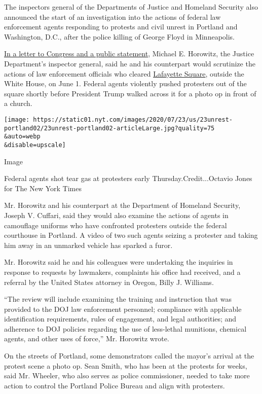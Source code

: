 The inspectors general of the Departments of Justice and Homeland
Security also announced the start of an investigation into the actions
of federal law enforcement agents responding to protests and civil
unrest in Portland and Washington, D.C., after the police killing of
George Floyd in Minneapolis.

\href{https://twitter.com/DanielStrauss4/status/1286375148115963904}{In
a letter to Congress and a public statement}, Michael E. Horowitz, the
Justice Department's inspector general, said he and his counterpart
would scrutinize the actions of law enforcement officials who cleared
\href{https://www.nytimes.com/2020/07/28/us/politics/lafayette-square-park-police-protests.html}{Lafayette
Square}, outside the White House, on June 1. Federal agents violently
pushed protesters out of the square shortly before President Trump
walked across it for a photo op in front of a church.

\texttt{[image: https://static01.nyt.com/images/2020/07/23/us/23unrest-portland02/23unrest-portland02-articleLarge.jpg?quality=75\\\&auto=webp\\\&disable=upscale]}

Image

Federal agents shot tear gas at protesters early
Thursday.Credit...Octavio Jones for The New York Times

Mr. Horowitz and his counterpart at the Department of Homeland Security,
Joseph V. Cuffari, said they would also examine the actions of agents in
camouflage uniforms who have confronted protesters outside the federal
courthouse in Portland. A video of two such agents seizing a protester
and taking him away in an unmarked vehicle has sparked a furor.

Mr. Horowitz said he and his colleagues were undertaking the inquiries
in response to requests by lawmakers, complaints his office had
received, and a referral by the United States attorney in Oregon, Billy
J. Williams.

``The review will include examining the training and instruction that
was provided to the DOJ law enforcement personnel; compliance with
applicable identification requirements, rules of engagement, and legal
authorities; and adherence to DOJ policies regarding the use of
less-lethal munitions, chemical agents, and other uses of force,'' Mr.
Horowitz wrote.

On the streets of Portland, some demonstrators called the mayor's
arrival at the protest scene a photo op. Sean Smith, who has been at the
protests for weeks, said Mr. Wheeler, who also serves as police
commissioner, needed to take more action to control the Portland Police
Bureau and align with protesters.

